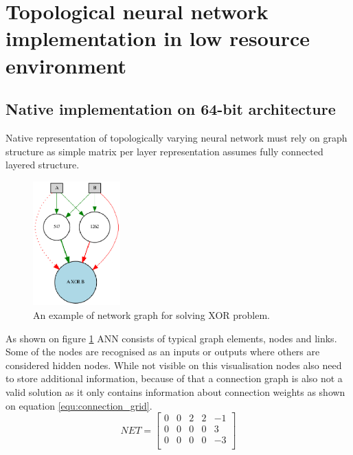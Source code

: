 \FloatBarrier
\section{Topological neural network implementation in low resource environment}

\FloatBarrier
\subsection{Native implementation on 64-bit architecture}
Native representation of topologically varying neural network must rely on graph structure as 
simple matrix per layer representation assumes fully connected layered structure.
\begin{figure}[htb] 
	\centering
	\includegraphics[width=0.3\textwidth]{figures/xor_network}
	\caption{An example of network graph for solving XOR problem.}
	\label{fig:xor_network}
\end{figure}
As shown on figure \ref{fig:xor_network} ANN consists of typical graph elements, 
nodes and links. Some of the nodes are recognised as an inputs or outputs where others are 
considered hidden nodes. While not visible on this visualisation nodes also need to store 
additional information, because of that a connection graph is also not a valid solution
as it only contains information about connection weights as shown on equation 
\ref{equ:connection_grid}.
\begin{equation}
	\label{equ:connection_grid}
	NET = \begin{bmatrix}
		0 & 0 & 2 & 2 & -1\\
		0 & 0 & 0 & 0 & 3\\
		0 & 0 & 0 & 0 & -3\\
	\end{bmatrix}
\end{equation}
